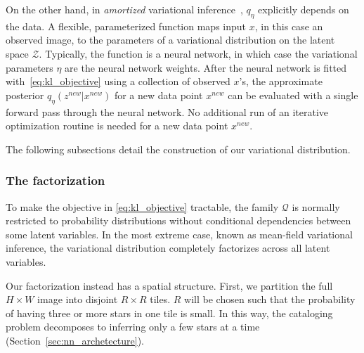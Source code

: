 On the other hand, 
in {\itshape amortized} variational
inference~\cite{kingma2013autoencoding, rezende2014stochastic}, $q_\eta$ explicitly depends on the data. 
A flexible, parameterized function maps input $x$, in this case an observed image, to the parameters of a variational distribution on the latent space $\mathcal{Z}$. 
Typically, the function is a neural network, in which case the variational parameters $\eta$ are the neural network weights. 
After the neural network is fitted with~\eqref{eq:kl_objective} using a collection of observed $x$'s, the approximate posterior $q_\eta(z^{new} | x^{new})$ for a new data point 
$x^{new}$ can be evaluated with a single forward pass through the neural network. 
No additional run of an iterative optimization routine is needed for a new data point $x^{new}$. 


The following subsections detail the construction of our variational distribution. 

\subsubsection{The factorization}
\label{sec:factorization}
To make the objective in \eqref{eq:kl_objective} tractable, the family $\mathcal{Q}$ is normally restricted to probability distributions 
without conditional dependencies between some latent variables. In the most extreme case, known as mean-field variational inference, the variational distribution completely factorizes across all latent variables. 

Our factorization instead has a spatial structure. 
First, we partition the full $H \times W$ image into disjoint $R \times R$ tiles. 
$R$ will be chosen such that the probability of having three or more stars in one tile is small. 
In this way, the cataloging problem decomposes to inferring only a few stars at a time (Section~\ref{sec:nn_archetecture}). 


